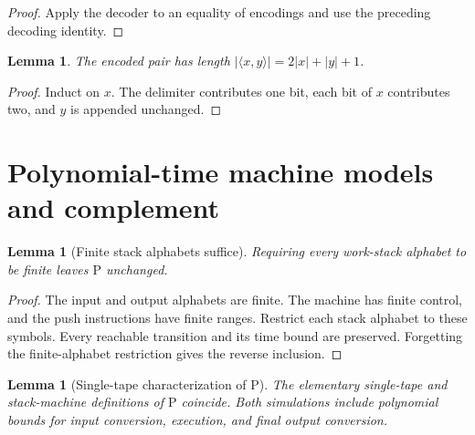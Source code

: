\documentclass[11pt]{article}
\newtheorem{lemma}[theorem]{Lemma}
\theoremstyle{definition}
\begin{document}
\begin{proof}\leavevmode
Apply the decoder to an equality of encodings and use the preceding decoding identity.
\qedhere
\end{proof}

\begin{lemma}\leavevmode
The encoded pair has length $|\langle x,y\rangle|=2|x|+|y|+1$.
\end{lemma}

\begin{proof}\leavevmode
Induct on $x$. The delimiter contributes one bit, each bit of $x$ contributes two, and $y$ is appended unchanged.
\qedhere
\end{proof}

\section{Polynomial-time machine models and complement}

\begin{lemma}[Finite stack alphabets suffice]\leavevmode
Requiring every work-stack alphabet to be finite leaves $\mathrm{P}$ unchanged.
\end{lemma}

\begin{proof}\leavevmode
The input and output alphabets are finite. The machine has finite control, and the push instructions have finite ranges. Restrict each stack alphabet to these symbols. Every reachable transition and its time bound are preserved. Forgetting the finite-alphabet restriction gives the reverse inclusion.
\qedhere
\end{proof}

\begin{lemma}[Single-tape characterization of P]\leavevmode
The elementary single-tape and stack-machine definitions of $\mathrm{P}$
coincide. Both simulations include polynomial bounds for input conversion,
execution, and final output conversion.
\end{lemma}
\end{document}

